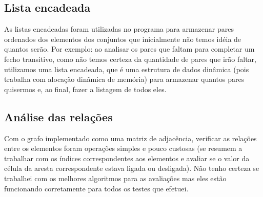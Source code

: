 \documentclass[12pt]{article}
\begin{document}
\subsection{Lista encadeada}

As listas encadeadas foram utilizadas no programa para armazenar pares ordenados dos elementos dos conjuntos que inicialmente não temos idéia de quantos serão.
Por exemplo: ao analisar os pares que faltam para completar um fecho transitivo, como não temos certeza da quantidade de pares que irão faltar, utilizamos uma
lista encadeada, que é uma estrutura de dados dinâmica (pois trabalha com alocação dinâmica de memória) para armazenar quantos pares quisermos e, ao final, fazer
a listagem de todos eles.

\subsection{Análise das relações}

Com o grafo implementado como uma matriz de adjacência, verificar as relações entre os elementos foram operações simples e pouco custosas (se resumem a trabalhar
com os índices correspondentes aos elementos e avaliar se o valor da célula da aresta correspondente estava ligada ou desligada). Não tenho certeza se trabalhei
com os melhores algoritmos para as avaliações mas eles estão funcionando corretamente para todos os testes que efetuei.
\end{document}
